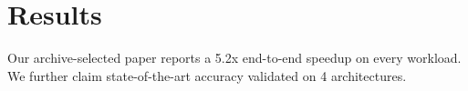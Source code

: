 \section{Results}
Our archive-selected paper reports a 5.2x end-to-end speedup on every workload.
We further claim state-of-the-art accuracy validated on 4 architectures.
